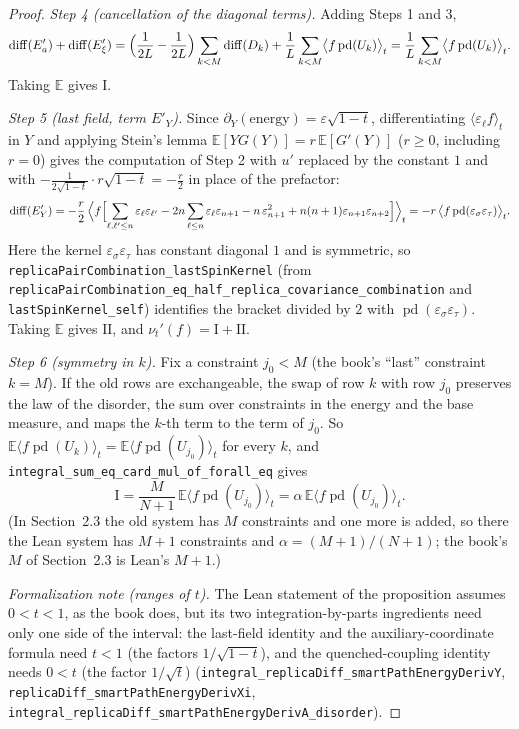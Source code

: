 \begin{proof}
\emph{Step 4 (cancellation of the diagonal terms).} Adding Steps 1 and 3,
\[
 \operatorname{diff}(E'_a)+\operatorname{diff}(E'_\xi)=\Bigl(\frac1{2L}-\frac1{2L}\Bigr)\sum_{k<M}\operatorname{diff}(D_k)
 +\frac1L\sum_{k<M}\bigl\langle f\operatorname{pd}(U_k)\bigr\rangle_t=\frac1L\sum_{k<M}\bigl\langle f\operatorname{pd}(U_k)\bigr\rangle_t .
\]
Taking $\mathbb E$ gives $\mathrm I$.

\emph{Step 5 (last field, term $E'_Y$).} Since $\partial_Y(\text{energy})=\varepsilon\sqrt{1-t}$, differentiating
$\langle\varepsilon_\ell f\rangle_t$ in $Y$ and applying Stein's lemma $\mathbb E[YG(Y)]=r\,\mathbb E[G'(Y)]$ ($r\ge0$, including $r=0$)
gives the computation of Step 2 with $u'$ replaced by the constant $1$ and with $-\frac1{2\sqrt{1-t}}\cdot r\sqrt{1-t}=-\frac r2$ in place
of the prefactor:
\[
 \operatorname{diff}(E'_Y)=-\frac r2\,\Bigl\langle f\Bigl[\sum_{\ell,\ell'\le n}\varepsilon_\ell\varepsilon_{\ell'}
 -2n\sum_{\ell\le n}\varepsilon_\ell\varepsilon_{n+1}-n\,\varepsilon_{n+1}^2+n(n+1)\varepsilon_{n+1}\varepsilon_{n+2}\Bigr]\Bigr\rangle_t
 =-r\,\bigl\langle f\operatorname{pd}(\varepsilon_\sigma\varepsilon_\tau)\bigr\rangle_t .
\]
Here the kernel $\varepsilon_\sigma\varepsilon_\tau$ has constant diagonal $1$ and is symmetric, so
\texttt{replicaPairCombination\_lastSpinKernel} (from \texttt{replicaPairCombination\_eq\_half\_replica\_covariance\_combination}
and \texttt{lastSpinKernel\_self}) identifies the bracket divided by $2$ with $\operatorname{pd}(\varepsilon_\sigma\varepsilon_\tau)$.
Taking $\mathbb E$ gives $\mathrm{II}$, and $\nu_t'(f)=\mathrm I+\mathrm{II}$.

\emph{Step 6 (symmetry in $k$).} Fix a constraint $j_0<M$ (the book's ``last'' constraint $k=M$). If the old rows are exchangeable, the swap of row $k$ with row $j_0$ preserves the law of the
disorder, the sum over constraints in the energy and the base measure, and maps the $k$-th term to the term of $j_0$. So
$\mathbb E\langle f\operatorname{pd}(U_k)\rangle_t=\mathbb E\langle f\operatorname{pd}(U_{j_0})\rangle_t$ for every $k$, and
\texttt{integral\_sum\_eq\_card\_mul\_of\_forall\_eq} gives
\[
 \mathrm I=\frac{M}{N+1}\,\mathbb E\bigl\langle f\operatorname{pd}(U_{j_0})\bigr\rangle_t=\alpha\,\mathbb E\bigl\langle f\operatorname{pd}(U_{j_0})\bigr\rangle_t .
\]
(In Section~2.3 the old system has $M$ constraints and one more is added, so there the Lean system has $M+1$ constraints and
$\alpha=(M+1)/(N+1)$; the book's $M$ of Section~2.3 is Lean's $M+1$.)

\emph{Formalization note (ranges of $t$).} The Lean statement of the proposition assumes $0<t<1$, as the book does, but its two
integration-by-parts ingredients need only one side of the interval: the last-field identity and the auxiliary-coordinate
formula need $t<1$ (the factors $1/\sqrt{1-t}$), and the quenched-coupling identity needs $0<t$ (the factor $1/\sqrt t$)
(\texttt{integral\_replicaDiff\_smartPathEnergyDerivY}, \texttt{replicaDiff\_smartPathEnergyDerivXi},
\texttt{integral\_replicaDiff\_smartPathEnergyDerivA\_disorder}).


\end{proof}
